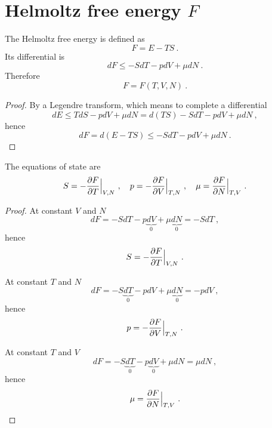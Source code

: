 \section{Helmoltz free energy $F$} 

    The Helmoltz free energy is defined as 
    \begin{equation*}
        F = E - TS ~.
    \end{equation*}
    Its differential is 
    \begin{equation*}
        dF \leq - S dT - p dV + \mu dN ~.
    \end{equation*}
    Therefore
    \begin{equation*}
        F = F(T, V, N) ~.
    \end{equation*}
    \begin{proof}
        By a Legendre transform, which means to complete a differential
        \begin{equation*}
            dE \leq T dS - p dV + \mu dN = d(TS) - S dT - p dV + \mu dN ~,
        \end{equation*}
        hence 
        \begin{equation*}
            dF = d(E - TS) \leq - S dT - p dV + \mu dN ~.
        \end{equation*}
    \end{proof}

    The equations of state are
    \begin{equation}
        S = - \frac{\partial F}{\partial T} \Big \vert_{V,N} ~, \quad p = - \frac{\partial F}{\partial V} \Big \vert_{T,N} ~, \quad \mu = \frac{\partial F}{\partial N} \Big \vert_{T,V} ~. 
    \end{equation}
    \begin{proof}
        At constant $V$ and $N$
        \begin{equation*}
            dF = - S dT - p \underbrace{dV}_0 + \mu \underbrace{dN}_0 = - S dT~,
        \end{equation*}
        hence 
        \begin{equation*}
            S = - \frac{\partial F}{\partial T} \Big \vert_{V,N} ~.
        \end{equation*}

        At constant $T$ and $N$
        \begin{equation*}
            dF = - S \underbrace{dT}_0 - p dV + \mu \underbrace{dN}_0 = - pdV ~,
        \end{equation*}
        hence 
        \begin{equation*}
            p = - \frac{\partial F}{\partial V} \Big \vert_{T,N} ~.
        \end{equation*}

        At constant $T$ and $V$
        \begin{equation*}
            dF = - S \underbrace{dT}_0 - p \underbrace{dV}_0 + \mu dN = \mu dN~,
        \end{equation*}
        hence 
        \begin{equation*}
            \mu = \frac{\partial F}{\partial N} \Big \vert_{T,V} ~.
        \end{equation*}
    \end{proof}

